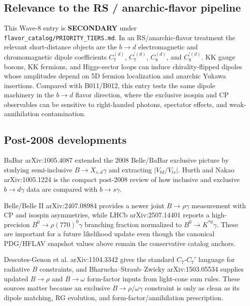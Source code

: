 \subsection*{Relevance to the RS / anarchic-flavor pipeline}
This Wave-8 entry is \textbf{SECONDARY} under
\texttt{flavor\_catalog/PRIORITY\_TIERS.md}.  In an RS/anarchic-flavor
treatment the relevant short-distance objects are the \(b\to d\)
electromagnetic and chromomagnetic dipole coefficients \(C_7^{(d)}\),
\(C_7^{\prime(d)}\), \(C_8^{(d)}\), and \(C_8^{\prime(d)}\).  KK gauge bosons,
KK fermions, and Higgs-sector loops can induce chirality-flipped dipoles whose
amplitudes depend on 5D fermion localization and anarchic Yukawa insertions.
Compared with B011/B012, this entry tests the same dipole machinery in the
\(b\to d\) flavor direction, where the exclusive isospin and CP observables can
be sensitive to right-handed photons, spectator effects, and weak-annihilation
contamination.

\subsection*{Post-2008 developments}
BaBar arXiv:1005.4087 extended the 2008 Belle/BaBar exclusive picture by
studying semi-inclusive \(B\to X_{s,d}\gamma\) and extracting
\(|V_{td}/V_{ts}|\).  Hurth and Nakao arXiv:1005.1224 is the compact
post-2008 review of how inclusive and exclusive \(b\to d\gamma\) data are
compared with \(b\to s\gamma\).

Belle/Belle II arXiv:2407.08984 provides a newer joint \(B\to\rho\gamma\)
measurement with CP and isospin asymmetries, while LHCb arXiv:2507.14401
reports a high-precision \(B^0\to\rho(770)^0\gamma\) branching fraction
normalized to \(B^0\to K^{*0}\gamma\).  These are important for a future
likelihood update even though the canonical PDG/HFLAV snapshot values above
remain the conservative catalog anchors.

Descotes-Genon et al. arXiv:1104.3342 gives the standard \(C_7\)-\(C_7'\)
language for radiative \(B\) constraints, and Bharucha--Straub--Zwicky
arXiv:1503.05534 supplies updated \(B\to\rho\) and \(B\to\omega\) form-factor
inputs from light-cone sum rules.  These sources matter because an exclusive
\(B\to\rho/\omega\gamma\) constraint is only as clean as its dipole matching,
RG evolution, and form-factor/annihilation prescription.

